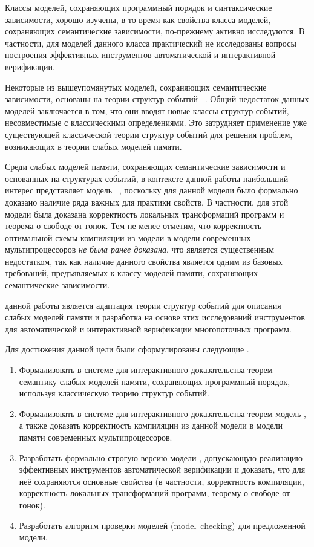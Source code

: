 Классы моделей, сохраняющих программный порядок и синтаксические зависимости, 
хорошо изучены, в то время как свойства класса моделей,
сохраняющих семантические зависимости, по-прежнему активно исследуются.
В частности, для моделей данного класса практический не исследованы
вопросы построения эффективных инструментов автоматической и интерактивной верификации. 

Некоторые из вышеупомянутых моделей, сохраняющих семантические зависимости,
основаны на теории структур событий%
~\autocite{Jeffrey-Riely:LICS16,PichonPharabod-Sewell:POPL16,
Chakraborty-Vafeiadis:POPL19,Paviotti-al:ESOP20}.
Общий недостаток данных моделей заключается в том,
что они вводят новые классы структур событий, 
несовместимые с классическими определениями.
Это затрудняет применение уже существующей классической теории структур событий
для решения проблем, возникающих в теории слабых моделей памяти. 

Среди слабых моделей памяти, сохраняющих семантические зависимости
и основанных на структурах событий, в контексте данной работы наибольший интерес
представляет модель \Wkm~\autocite{Chakraborty-Vafeiadis:POPL19},
поскольку для данной модели было формально доказано наличие ряда важных для практики свойств.
В частности, для этой модели была доказана корректность
локальных трансформаций программ и теорема о свободе от гонок.
Тем не менее отметим, что корректность оптимальной схемы
компиляции из модели \Wkm в модели современных мультипроцессоров
\emph{не была ранее доказана}, что является существенным недостатком,
так как наличие данного свойства является одним из базовых требований,
предъявляемых к классу моделей памяти, сохраняющих семантические зависимости.

{\aim} данной работы является адаптация теории структур событий
для описания слабых моделей памяти и разработка на основе этих исследований 
инструментов для автоматической и интерактивной верификации многопоточных программ. 

Для достижения данной цели были сформулированы следующие {\tasks}.
\begin{enumerate}[beginpenalty=10000] %
  \item 
    Формализовать в системе для интерактивного доказательства теорем \coq
    семантику  слабых моделей памяти, сохраняющих программный порядок, используя
    классическую теорию структур событий. 
  \item 
    Формализовать в системе для интерактивного доказательства теорем \coq
    модель \Wkm, а также  доказать  корректность компиляции
    из данной модели в модели памяти современных мультипроцессоров.
  \item Разработать формально строгую версию модели \Wkm, 
    допускающую реализацию эффективных инструментов автоматической верификации
    и доказать, что для неё сохраняются  основные свойства \Wkm  
    (в частности, корректность компиляции, корректность локальных трансформаций программ, 
     теорему о свободе от гонок).
  \item Разработать алгоритм проверки моделей (model~checking) для предложенной модели.
\end{enumerate}

